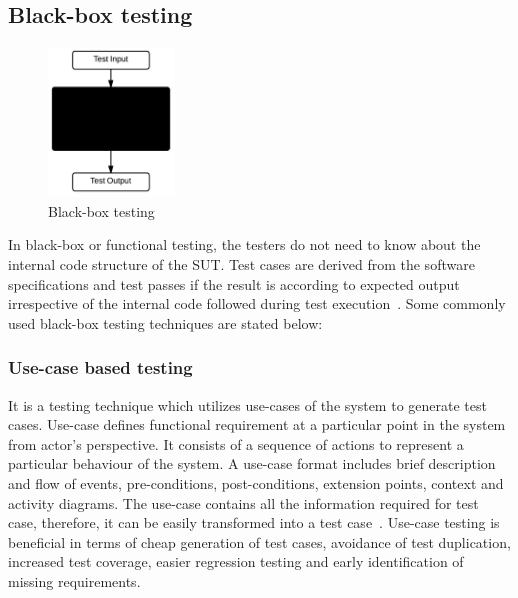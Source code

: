\subsection{Black-box testing}
\begin{figure}
  \vspace{-35pt}
  \begin{center}
    \includegraphics[width=0.30\textwidth]{chapter2/blackBox.png}
  \end{center}
  \vspace{-20pt}
  \bigskip
  \caption{Black-box testing}
  \label{fig:blackBox}
  \vspace{-18pt}
 \end{figure}
In black-box or functional testing, the testers do not need to know about the internal code structure of the SUT. Test cases are derived from the software specifications and test passes if the result is according to expected output irrespective of the internal code followed during test execution~\cite{beizer1995black}. Some commonly used black-box testing techniques are stated below:



\subsubsection{Use-case based testing}
It is a testing technique which utilizes use-cases of the system to generate test cases. Use-case defines functional requirement at a particular point in the system from actor's perspective. It consists of a sequence of actions to represent a particular behaviour of the system. A use-case format includes brief description and flow of events, pre-conditions, post-conditions, extension points, context and activity diagrams. The use-case contains all the information required for test case, therefore, it can be easily transformed into a test case~\cite{armour2000advanced}. Use-case testing is beneficial in terms of cheap generation of test cases, avoidance of test duplication, increased test coverage, easier regression testing and early identification of missing requirements.  

